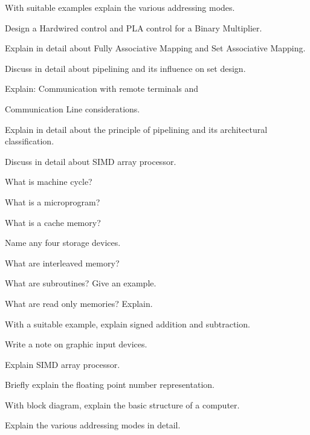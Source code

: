 \newpage \again

\item With suitable examples explain the various addressing modes.
\ene

\item \iitem Design a Hardwired control and PLA control for a Binary
  Multiplier.
\Or
\item Explain in detail about Fully Associative Mapping and Set Associative
  Mapping.
\ene

\item \iitem Discuss in detail about pipelining and its influence on set
  design.
\Or
\item Explain: \iitem Communication with remote terminals and
\item Communication Line considerations.\ene
\ene

\item \iitem Explain in detail about the principle of pipelining and its
  architectural classification.
\Or
\item Discuss in detail about SIMD array processor.
\ene

\markC
\ene

\newpage

\sub{\subj}
\maxtime

\partA

\iitem What is machine cycle?
\item What is a microprogram?
\item What is a cache memory?
\item Name any four storage devices.
\item What are interleaved memory?

\markA
\partB

\item What are subroutines? Give an example.
\item What are read only memories? Explain.
\item With a suitable example, explain signed
  addition and subtraction.
\item Write a note on graphic input devices.
\item Explain SIMD array processor.
\item Briefly explain the floating point number representation.

\markB
\partC

\item \iitem With block diagram, explain the basic structure of a 
  computer.
\Or
\item Explain the various addressing modes in detail.
\ene

